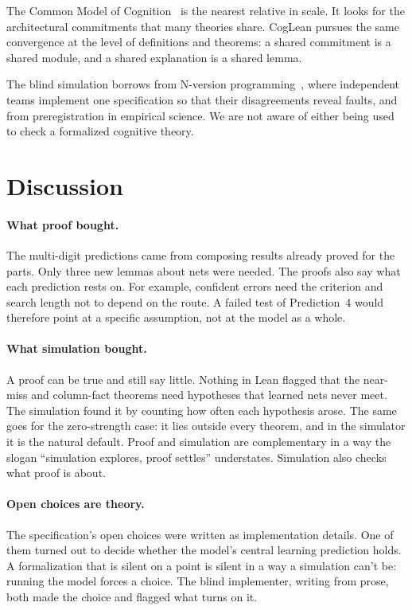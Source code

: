 \documentclass[11pt]{article}
\begin{document}
The Common Model of Cognition~\cite{laird2017} is the nearest relative in scale. It looks for the architectural commitments that many theories share. CogLean pursues the same convergence at the level of definitions and theorems: a shared commitment is a shared module, and a shared explanation is a shared lemma.

The blind simulation borrows from N-version programming~\cite{avizienis1985}, where independent teams implement one specification so that their disagreements reveal faults, and from preregistration in empirical science. We are not aware of either being used to check a formalized cognitive theory.

\section{Discussion}

\paragraph{What proof bought.} The multi-digit predictions came from composing results already proved for the parts. Only three new lemmas about nets were needed. The proofs also say what each prediction rests on. For example, confident errors need the criterion and search length not to depend on the route. A failed test of Prediction~4 would therefore point at a specific assumption, not at the model as a whole.

\paragraph{What simulation bought.} A proof can be true and still say little. Nothing in Lean flagged that the near-miss and column-fact theorems need hypotheses that learned nets never meet. The simulation found it by counting how often each hypothesis arose. The same goes for the zero-strength case: it lies outside every theorem, and in the simulator it is the natural default. Proof and simulation are complementary in a way the slogan ``simulation explores, proof settles'' understates. Simulation also checks what proof is about.

\paragraph{Open choices are theory.} The specification's open choices were written as implementation details. One of them turned out to decide whether the model's central learning prediction holds. A formalization that is silent on a point is silent in a way a simulation can't be: running the model forces a choice. The blind implementer, writing from prose, both made the choice and flagged what turns on it.
\end{document}
